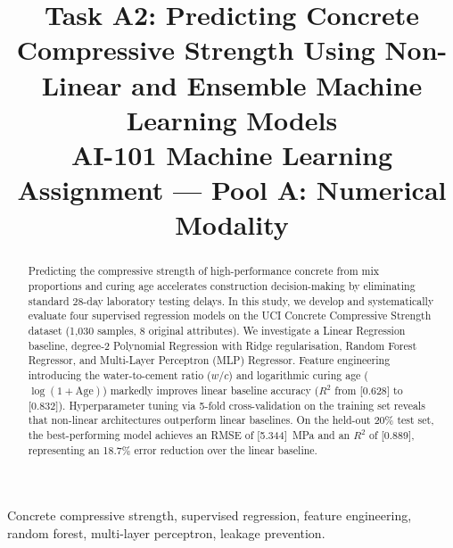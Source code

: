 \documentclass[conference]{IEEEtran}
\begin{document}
\title{Task A2: Predicting Concrete Compressive Strength Using Non-Linear and Ensemble Machine Learning Models\\
\large AI-101 Machine Learning Assignment --- Pool A: Numerical Modality}

\author{
\and
{}
}

\maketitle

\begin{abstract}
Predicting the compressive strength of high-performance concrete from mix proportions and curing age accelerates construction decision-making by eliminating standard 28-day laboratory testing delays. In this study, we develop and systematically evaluate four supervised regression models on the UCI Concrete Compressive Strength dataset (1,030 samples, 8 original attributes). We investigate a Linear Regression baseline, degree-2 Polynomial Regression with Ridge regularisation, Random Forest Regressor, and Multi-Layer Perceptron (MLP) Regressor. Feature engineering introducing the water-to-cement ratio ($w/c$) and logarithmic curing age ($\log(1+\text{Age})$) markedly improves linear baseline accuracy ($R^2$ from [0.628] to [0.832]). Hyperparameter tuning via 5-fold cross-validation on the training set reveals that non-linear architectures outperform linear baselines. On the held-out 20\% test set, the best-performing model achieves an RMSE of [5.344]~MPa and an $R^2$ of [0.889], representing an 18.7\% error reduction over the linear baseline.
\end{abstract}

\begin{IEEEkeywords}
Concrete compressive strength, supervised regression, feature engineering, random forest, multi-layer perceptron, leakage prevention.
\end{IEEEkeywords}
\end{document}
